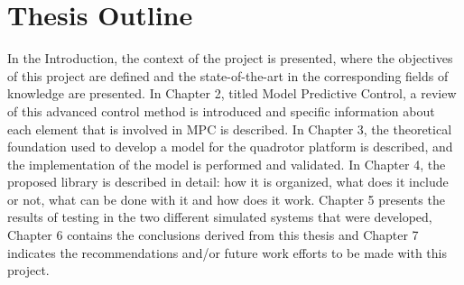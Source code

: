 \section{Thesis Outline}

In the Introduction, the context of the project is presented, where the objectives of this project are defined and the state-of-the-art in the corresponding fields of knowledge are presented. In Chapter 2, titled Model Predictive Control, a review of this advanced control method is introduced and specific information about each element that is involved in MPC is described. In Chapter 3, the theoretical foundation used to develop a model for the quadrotor platform is described, and the implementation of the model is performed and validated. In Chapter 4, the proposed library is described in detail: how it is organized, what does it include or not, what can be done with it and how does it work. Chapter 5 presents the results of testing in the two different simulated systems that were developed, Chapter 6 contains the conclusions derived from this thesis and Chapter 7 indicates the recommendations and/or future work efforts to be made with this project.  

 	




 
